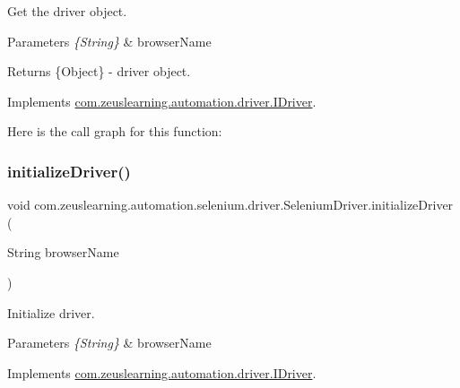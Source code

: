 Get the driver object.


\begin{DoxyParams}{Parameters}
{\em \{\+String\}} & browser\+Name \\
\hline
\end{DoxyParams}
\begin{DoxyReturn}{Returns}
\{Object\} -\/ driver object. 
\end{DoxyReturn}


Implements \hyperlink{interfacecom_1_1zeuslearning_1_1automation_1_1driver_1_1IDriver_a9c4bbcfcf72e1b1f556c7c8298dc8e2a}{com.\+zeuslearning.\+automation.\+driver.\+I\+Driver}.

Here is the call graph for this function\+:
\hypertarget{classcom_1_1zeuslearning_1_1automation_1_1selenium_1_1driver_1_1SeleniumDriver_a187f5d9442edc299d894d1dbeafeda0d}{}\label{classcom_1_1zeuslearning_1_1automation_1_1selenium_1_1driver_1_1SeleniumDriver_a187f5d9442edc299d894d1dbeafeda0d} 
\subsubsection{\texorpdfstring{initialize\+Driver()}{initializeDriver()}}
{\footnotesize\ttfamily void com.\+zeuslearning.\+automation.\+selenium.\+driver.\+Selenium\+Driver.\+initialize\+Driver (\begin{DoxyParamCaption}\item[{String}]{browser\+Name }\end{DoxyParamCaption})\hspace{0.3cm}{\ttfamily [inline]}}

Initialize driver.


\begin{DoxyParams}{Parameters}
{\em \{\+String\}} & browser\+Name \\
\hline
\end{DoxyParams}


Implements \hyperlink{interfacecom_1_1zeuslearning_1_1automation_1_1driver_1_1IDriver_a5662e9a248835364fcd27b0df392c3ea}{com.\+zeuslearning.\+automation.\+driver.\+I\+Driver}.

